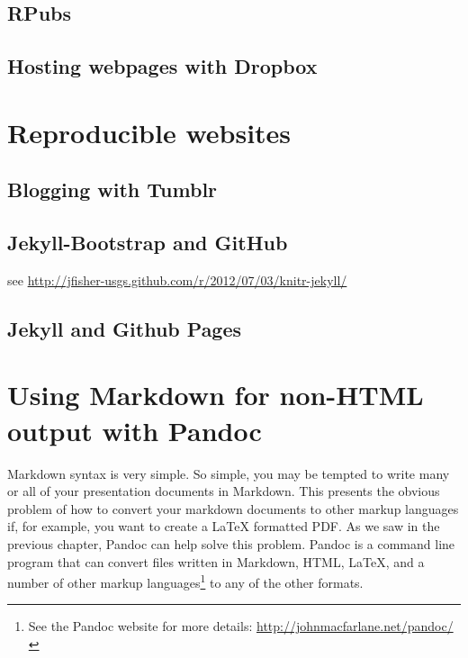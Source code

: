 \subsection{RPubs}

\subsection{Hosting webpages with Dropbox}

\section{Reproducible websites}

\subsection{Blogging with Tumblr}

\subsection{Jekyll-Bootstrap and GitHub}

see \url{http://jfisher-usgs.github.com/r/2012/07/03/knitr-jekyll/}

\subsection{Jekyll and Github Pages}

\section{Using Markdown for non-HTML output with Pandoc}

Markdown syntax is very simple. So simple, you may be tempted to write many or all of your presentation documents in Markdown. This presents the obvious problem of how to convert your markdown documents to other markup languages if, for example, you want to create a LaTeX formatted PDF. As we saw in the previous chapter, Pandoc can help solve this problem. Pandoc is a command line program that can convert files written in Markdown, HTML, LaTeX, and a number of other markup languages\footnote{See the Pandoc website for more details: \url{http://johnmacfarlane.net/pandoc/}} to any of the other formats. 


  
